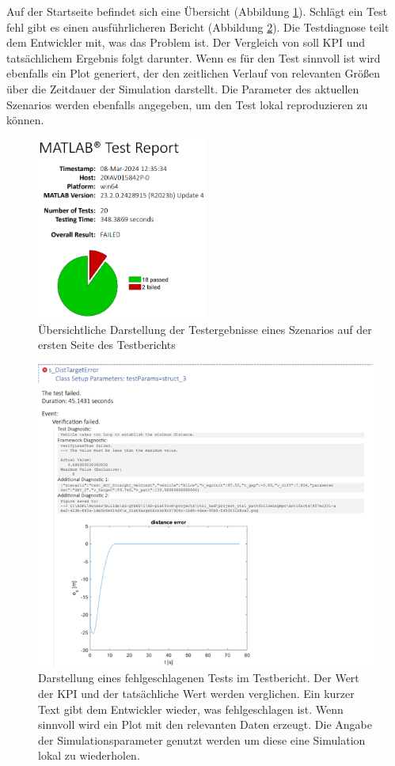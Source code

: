 Auf der Startseite befindet sich eine Übersicht (Abbildung \ref{fig:testreport_aufmacher}). Schlägt ein Test fehl gibt es einen ausführlicheren Bericht (Abbildung \ref{fig:failed_test}). Die Testdiagnose teilt dem Entwickler mit, was das Problem ist. Der Vergleich von soll KPI und tatsächlichem Ergebnis folgt darunter. Wenn es für den Test sinnvoll ist wird ebenfalls ein Plot generiert, der den zeitlichen Verlauf von relevanten Größen über die Zeitdauer der Simulation darstellt. Die Parameter des aktuellen Szenarios werden ebenfalls angegeben, um den Test lokal reproduzieren zu können.
\begin{figure}[ht]
    \centering
    \includegraphics[width=0.5\textwidth]{figures/3_Implementierung/testreport_aufmacher.png}
    \caption{Übersichtliche Darstellung der Testergebnisse eines Szenarios auf der ersten Seite des Testberichts}
    \label{fig:testreport_aufmacher}
\end{figure}
\begin{figure}[ht]
    \centering
    \includegraphics[width=\textwidth]{figures/3_Implementierung/failed_test.png}
    \caption{Darstellung eines fehlgeschlagenen Tests im Testbericht. Der Wert der KPI und der tatsächliche Wert werden verglichen. Ein kurzer Text gibt dem Entwickler wieder, was fehlgeschlagen ist. Wenn sinnvoll wird ein Plot mit den relevanten Daten erzeugt. Die Angabe der Simulationsparameter genutzt werden um diese eine Simulation lokal zu wiederholen.}
    \label{fig:failed_test}
\end{figure}
